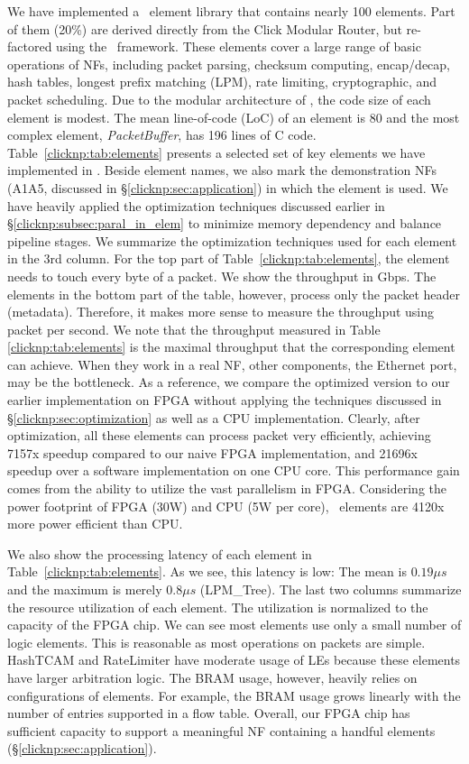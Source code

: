 We have implemented a \name\ element library that contains nearly 100 elements. 
Part of them (20\%) are derived directly from the Click Modular Router, 
but re-factored using the \name\ framework. 
These elements cover a large range of basic operations of NFs, 
including packet parsing, checksum computing,
encap/decap, hash tables, longest prefix matching (LPM), 
rate limiting, cryptographic, and packet scheduling. 
%
Due to the modular architecture of \name, the code size of each element is modest. 
The mean line-of-code (LoC) of an element is 80 and 
the most complex element, \textit{PacketBuffer}, has 196 lines of C code. 
% 
Table~\ref{clicknp:tab:elements} presents a selected set of key elements we have implemented in \name. 
Beside element names, we also mark the demonstration NFs (A1\approx A5, discussed in \S\ref{clicknp:sec:application}) in 
which the element is used.
%
We have heavily applied the optimization techniques discussed earlier in \S\ref{clicknp:subsec:paral_in_elem} to 
minimize memory dependency and balance pipeline stages.
We summarize the optimization techniques used for each element in the 3rd column.
For the top part of Table~\ref{clicknp:tab:elements}, the element needs to touch every byte of a packet. We show the throughput in Gbps.
The elements in the bottom part of the table, however, process only the packet header (metadata). Therefore, it makes more
sense to measure the throughput using packet per second.
%
We note that the throughput measured in Table \ref{clicknp:tab:elements} is the maximal throughput that the corresponding element can achieve.
When they work in a real NF, other components, \eg the Ethernet port, may be the bottleneck.
%
As a reference, we compare the optimized version to our earlier  
implementation on FPGA without applying the techniques discussed in \S\ref{clicknp:sec:optimization} as well as a CPU implementation.
Clearly, after optimization, all these elements can process packet very efficiently, achieving 7\approx 157x speedup compared to our naive FPGA implementation, and 21\approx 696x speedup over a software implementation on one CPU core.
This performance gain comes from the ability to utilize the vast parallelism in FPGA.
%
Considering the power footprint of FPGA (\approx 30W) and CPU (\approx 5W per core), 
\name\ elements are 4\approx 120x more power efficient than CPU. 

We also show the processing latency of each element in Table~\ref{clicknp:tab:elements}. 
As we see, this latency is low: The mean is $0.19 \mu s$ and the maximum is merely $0.8 \mu s$ (LPM\_Tree).
The last two columns summarize the resource utilization of each element. The utilization is normalized to
the capacity of the FPGA chip. 
We can see most elements use only a small number of logic elements.
This is reasonable as most operations on packets are simple. 
HashTCAM and RateLimiter have moderate usage of LEs because these elements have larger arbitration logic. 
%
The BRAM usage, however, heavily relies on configurations of elements. For example, the BRAM usage grows linearly 
with the number of entries supported in a flow table. 
Overall, our FPGA chip has sufficient capacity to support a meaningful 
NF containing a handful elements (\S\ref{clicknp:sec:application}).



